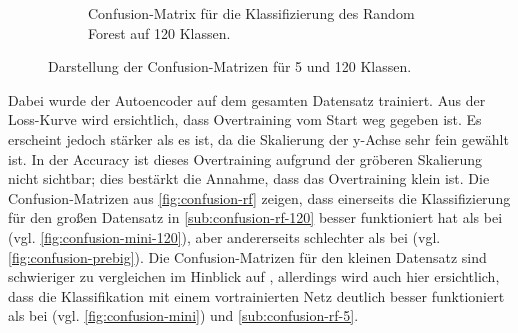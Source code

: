 \begin{figure}
\begin{subfigure}{0.49\textwidth}
    \caption{Confusion-Matrix für die Klassifizierung des Random Forest auf 120 Klassen.}
    \label{sub:confusion-rf-120}
  \end{subfigure}
  \caption{Darstellung der Confusion-Matrizen für 5 und 120 Klassen.}
  \label{fig:confusion-rf}
\end{figure}
Dabei wurde der Autoencoder auf dem
gesamten Datensatz trainiert. Aus der Loss-Kurve wird ersichtlich, dass
Overtraining vom Start weg gegeben ist. Es erscheint jedoch stärker als es ist,
da die Skalierung der y-Achse sehr fein gewählt ist. In der Accuracy ist dieses
Overtraining aufgrund der gröberen Skalierung nicht sichtbar; dies bestärkt die
Annahme, dass das Overtraining klein ist.
Die Confusion-Matrizen aus \autoref{fig:confusion-rf} zeigen, dass einerseits
die Klassifizierung für den großen Datensatz in \autoref{sub:confusion-rf-120} besser funktioniert hat
als bei \MiniDog{} (vgl. \autoref{fig:confusion-mini-120}), aber andererseits schlechter als bei
\PreBig{} (vgl. \autoref{fig:confusion-prebig}). Die Confusion-Matrizen für den kleinen Datensatz
sind schwieriger zu vergleichen im Hinblick auf \MiniDog{}, allerdings wird auch
hier ersichtlich, dass die Klassifikation mit einem vortrainierten Netz deutlich
besser funktioniert als bei \MiniDog{} (vgl. \autoref{fig:confusion-mini}) und
\autoref{sub:confusion-rf-5}.
